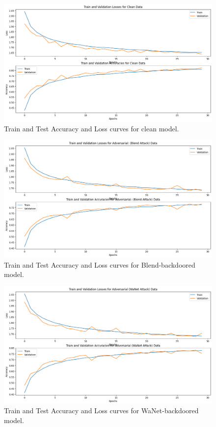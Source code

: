 \documentclass{article}
\begin{document}
\begin{figure}
    \centering
    \includegraphics[width=1\textwidth]{curves_clean.png}
    \caption{Train and Test Accuracy and Loss curves for clean model.}
\end{figure}
\begin{figure}
    \centering
    \includegraphics[width=1\textwidth]{curves_blend.png}
    \caption{Train and Test Accuracy and Loss curves for Blend-backdoored model.}
\end{figure}
\begin{figure}
    \centering
    \includegraphics[width=1\textwidth]{curves_wanet.png}
    \caption{Train and Test Accuracy and Loss curves for WaNet-backdoored model.}
\end{figure}
\end{document}
